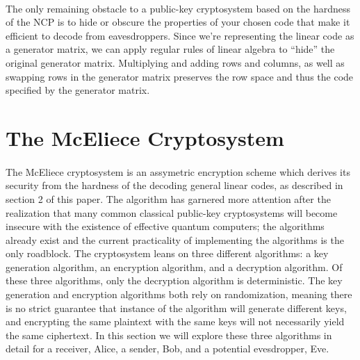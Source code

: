 \documentclass{article}
\theoremstyle{definition}
\begin{document}
\paragraph{}
The only remaining obstacle to a public-key cryptosystem based on the hardness of the NCP is to hide or obscure the properties of your chosen code that make it efficient to decode from eavesdroppers. Since we're representing the linear code as a generator matrix, we can apply regular rules of linear algebra to ``hide'' the original generator matrix. Multiplying and adding rows and columns, as well as swapping rows in the generator matrix preserves the row space and thus the code specified by the generator matrix.

\section{The McEliece Cryptosystem}
\paragraph{} The McEliece cryptosystem is an assymetric encryption scheme which derives its security from the hardness of the decoding general linear codes, as described in section 2 of this paper.  The algorithm has garnered more attention after the realization that many common classical public-key cryptosystems will become insecure with the existence of effective quantum computers; the algorithms already exist and the current practicality of implementing the algorithms is the only roadblock.  The cryptosystem leans on three different algorithms: a key generation algorithm, an encryption algorithm, and a decryption algorithm.  Of these three algorithms, only the decryption algorithm is deterministic.  The key generation and encryption algorithms both rely on randomization, meaning there is no strict guarantee that instance of the algorithm will generate different keys, and encrypting the same plaintext with the same keys will not necessarily yield the same ciphertext.  In this section we will explore these three algorithms in detail for a receiver, Alice, a sender, Bob, and a potential evesdropper, Eve.
\end{document}
